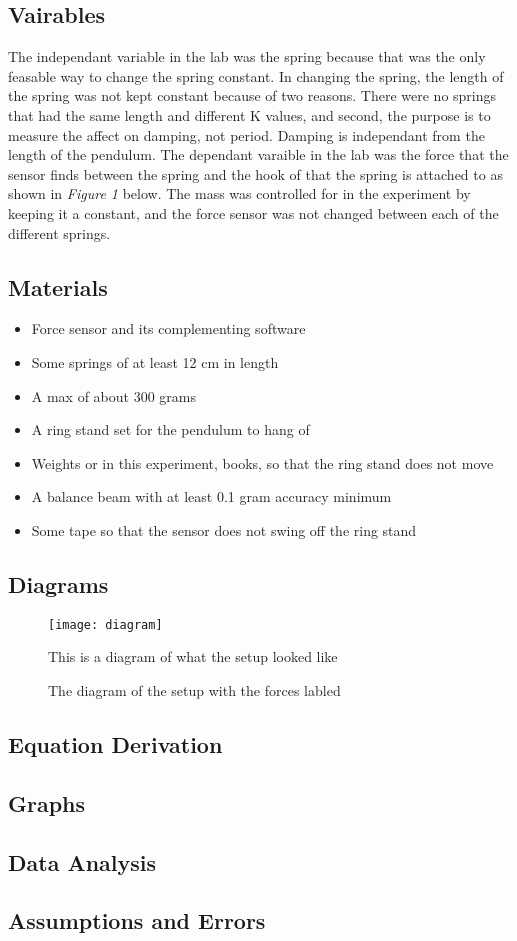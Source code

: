 \documentclass{report}
\begin{document}
\subsection*{Vairables}
\indent The independant variable in the lab was the spring because that was the only feasable way to change the spring constant. In changing the spring, the length of the spring was not kept constant because of two reasons. There were no springs that had the same length and different K values, and second, the purpose is to measure the affect on damping, not period. Damping is independant from the length of the pendulum. The dependant varaible in the lab was the force that the sensor finds between the spring and the hook of that the spring is attached to as shown in \textit{Figure 1} below. The mass was controlled for in the experiment by keeping it a constant, and the force sensor was not changed between each of the different springs.

\subsection*{Materials}
\begin{itemize}
\item Force sensor and its complementing software
\item Some springs of at least 12 cm in length
\item A max of about 300 grams
\item A ring stand set for the pendulum to hang of
\item Weights or in this experiment, books, so that the ring stand does not move
\item A balance beam with at least 0.1 gram accuracy minimum
\item Some tape so that the sensor does not swing off the ring stand
\end{itemize}

\subsection*{Diagrams}
\begin{figure}[h]
\texttt{[image: diagram]}
\caption{This is a diagram of what the setup looked like}
\end{figure}
\begin{figure}[h]
\caption{The diagram of the setup with the forces labled}
\end{figure}
\subsection*{Equation Derivation}

\subsection*{Graphs}

\subsection*{Data Analysis}

\subsection*{Assumptions and Errors}
\end{document}
